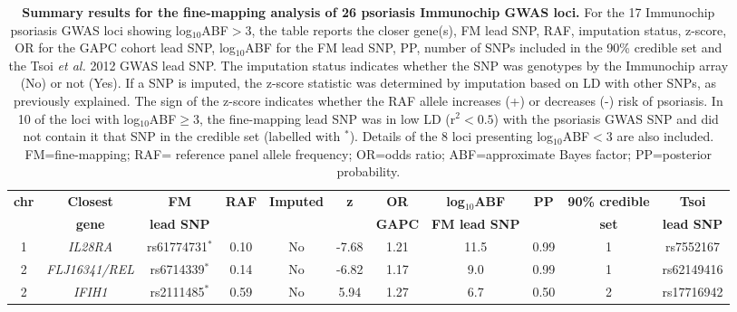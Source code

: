 \begin{landscape}
\renewcommand{\arraystretch}{0.7}
\begin{center}
\begin{longtable}[ht]{c c c c c c c c c c c}
\caption[Summary results for the fine-mapping analysis of 26 psoriasis Immunochip GWAS loci.]{\textbf{Summary results for the fine-mapping analysis of 26 psoriasis Immunochip GWAS loci.} For the 17 Immunochip psoriasis GWAS loci showing log${_10}$ABF$>3$, the table reports the closer gene(s), FM lead SNP, RAF, imputation status, z-score, OR for the GAPC cohort lead SNP, log$_{10}$ABF for the FM lead SNP, PP, number of SNPs included in the 90\% credible set and the Tsoi \textit{et al.} 2012 GWAS lead SNP. The imputation status indicates whether the SNP was genotypes by the Immunochip array (No) or not (Yes). If a SNP is imputed, the z-score statistic was determined by imputation based on LD with other SNPs, as previously explained. The sign of the z-score indicates whether the RAF allele increases (+) or decreases (-) risk of psoriasis. In 10 of the loci with log$_{10}$ABF$\geq$3, the fine-mapping lead SNP was in low LD (r${^2}<0.5$) with the psoriasis GWAS SNP and did not contain it that SNP in the credible set (labelled with $^{\ast}$). Details of the 8 loci presenting log${_10}$ABF$<3$ are also included. FM=fine-mapping; RAF= reference panel allele frequency; OR=odds ratio; ABF=approximate Bayes factor; PP=posterior probability.}
\label{tab:Psoriasis_fine_mapping_summary} \\
\toprule
\textbf{chr} & \textbf{Closest} & \textbf{FM} & \textbf{RAF} & \textbf{Imputed}& \textbf{z} &\textbf{OR} & \textbf{log$_{10}$ABF} & \textbf{PP} & \textbf{90\% credible} &\textbf{Tsoi} \\
              & \textbf{gene} & \textbf{lead SNP} &        &                  &           &\textbf{GAPC} & \textbf{FM lead SNP} &             & \textbf{set}           &\textbf{lead SNP} \\
\midrule
\midrule
1	& \textit{IL28RA}&	     rs61774731$^{\ast}$   &		0.10 &	No	& -7.68 &1.21 &		11.5 &		0.99 &		1	 &	rs7552167 \\
2	& \textit{FLJ16341/REL}& rs6714339$^{\ast}$    &		0.14 &	No	& -6.82 &1.17 &		9.0  &		0.99 &		1	 &	rs62149416 \\
2	& \textit{IFIH1}&		     rs2111485$^{\ast}$    &		0.59 &	No	& 5.94  &1.27 &		6.7  &		0.50 &		2	 &	rs17716942 \\

\end{longtable}
\end{center}
\end{landscape}
